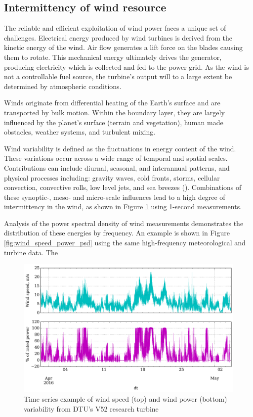 \subsection{Intermittency of wind resource}
\label{sec:intro_intermittency}

The reliable and efficient exploitation of wind power faces a unique set of challenges. Electrical energy produced by wind turbines is derived from the kinetic energy of the wind. Air flow generates a lift force on the blades causing them to rotate. This mechanical energy ultimately drives the generator, producing electricity which is collected and fed to the power grid. As the wind is not a controllable fuel source, the turbine's output will to a large extent be determined by atmospheric conditions.

Winds originate from differential heating of the Earth's surface and are transported by bulk motion. Within the boundary layer, they are largely influenced by the planet's surface (terrain and vegetation), human made obstacles, weather systems, and turbulent mixing.

Wind variability is defined as the fluctuations in energy content of the wind. These variations occur across a wide range of temporal and spatial scales. Contributions can include diurnal, seasonal, and interannual patterns, and physical processes including: gravity waves, cold fronts, storms, cellular convection, convective rolls, low level jets, and sea breezes (\cite{vincent_forecasting_2017}). Combinations of these synoptic-, meso- and micro-scale influences lead to a high degree of intermittency in the wind, as shown in Figure \ref{fig:wind_speed_power_ts} using 1-second measurements.

Analysis of the power spectral density of wind measurements demonstrates the distribution of these energies by frequency. 
An example is shown in Figure \ref{fig:wind_speed_power_psd} using the same high-frequency meteorological and turbine data. The 

\begin{figure}[htbp]
    \centering
        \includegraphics[width=1.0\textwidth]{graphics/intro/variability/wind_speed_power_ts.png}
    \caption{Time series example of wind speed (top) and wind power (bottom) variability from DTU's V52 research turbine}
    \label{fig:wind_speed_power_ts}
\end{figure}

